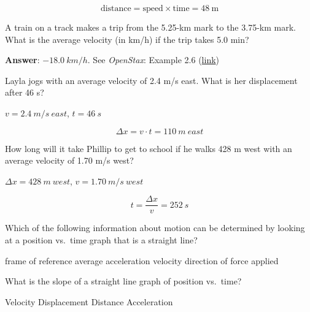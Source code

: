 \documentclass[answers]{exam}
\begin{document}
\begin{questions}
\begin{questions}
\begin{solution}
\begin{equation*}
    \text{distance} = \text{speed} \times \text{time} = \SI{48}{\meter} 
\end{equation*}
\end{solution}


\question
A train on a track makes a trip from the 5.25-km mark to the 3.75-km mark. What is the average velocity (in km/h) if the trip takes 5.0 min?

\begin{solution}
    \textbf{Answer}: $\SI{-18.0}{km/h}$. See \textit{OpenStax}: Example 2.6 (\href{https://openstax.org/books/college-physics/pages/2-4-acceleration}{link})
\end{solution}

\question
Layla jogs with an average velocity of 2.4 m/s east. What is her displacement after 46 s?

\begin{solution}
    $v = \SI{2.4}{m/s\ east}$, $t = \SI{46}{s}$

\begin{equation*}
    \Delta{x} = v \cdot t = \SI{110}{m\ east}
\end{equation*}
\end{solution}


\question
How long will it take Phillip to get to school if he walks 428 m west with an average velocity of 1.70 m/s west?

\begin{solution}
    $\Delta{x} = \SI{428}{m\ west}$, $v = \SI{1.70}{m/s\ west}$

\begin{equation*}
    t = \frac{\Delta{x}}{v} = \SI{252}{s}
\end{equation*}
\end{solution}


\question
Which of the following information about motion can be determined by looking at a position vs.~time graph that is a straight line?

\begin{choices}
\choice frame of reference
\choice average acceleration
\CorrectChoice velocity
\choice direction of force applied
\end{choices}

\question
What is the slope of a straight line graph of position vs.~time?

\begin{choices}
\CorrectChoice Velocity
\choice Displacement
\choice Distance
\choice Acceleration
\end{choices}


\end{questions}
\end{questions}
\end{document}

